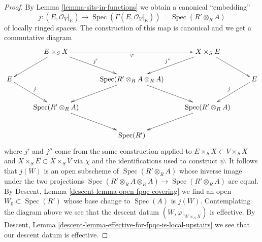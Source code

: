 \documentclass{stacks-project}
\theoremstyle{plain}
\theoremstyle{definition}
\theoremstyle{remark}
\numberwithin{equation}{subsection}
\def\Spec{\mathop{\mathrm{Spec}}}
\begin{document}
\begin{proof}
\medskip\noindent
By Lemma \ref{lemma-sits-in-functions} we obtain a canonical ``embedding''
$$
j : (E, \mathcal{O}_V|_E) \longrightarrow
\Spec(\Gamma(E, \mathcal{O}_V|_E)) = \Spec(R' \otimes_R A)
$$
of locally ringed spaces. The construction of this map is canonical
and we get a commutative diagram
$$
\xymatrix{
& E \times_S X \ar[rr]_\varphi \ar[ld] \ar[rd]^{j'} & &
X \times_S E \ar[rd] \ar[ld]_{j''} \\
E \ar[rd]^j  & &
\Spec(R' \otimes_R A \otimes_R A) \ar[ld] \ar[rd] & &
E \ar[ld]_j \\
& \Spec(R' \otimes_R A) \ar[rd] && \Spec(R' \otimes_R A) \ar[ld] \\
& & \Spec(R')
}
$$
where $j'$ and $j''$ come from the same construction applied to
$E \times_S X \subset V \times_S X$ and $X \times_S E \subset X \times_S V$
via $\chi$ and the identifications used to construct $\psi$.
It follows that $j(W)$ is an open subscheme of $\Spec(R' \otimes_R A)$
whose inverse image under the two projections
$\Spec(R' \otimes_R A \otimes_R A) \to \Spec(R' \otimes_R A)$
are equal. By Descent, Lemma \ref{descent-lemma-open-fpqc-covering}
we find an open $W_0 \subset \Spec(R')$ whose base change
to $\Spec(A)$ is $j(W)$. Contemplating the diagram above
we see that the descent datum $(W, \varphi|_{W \times_S X})$
is effective. By Descent, Lemma
\ref{descent-lemma-effective-for-fpqc-is-local-upstairs}
we see that our descent datum is effective.
\end{proof}










\end{document}
